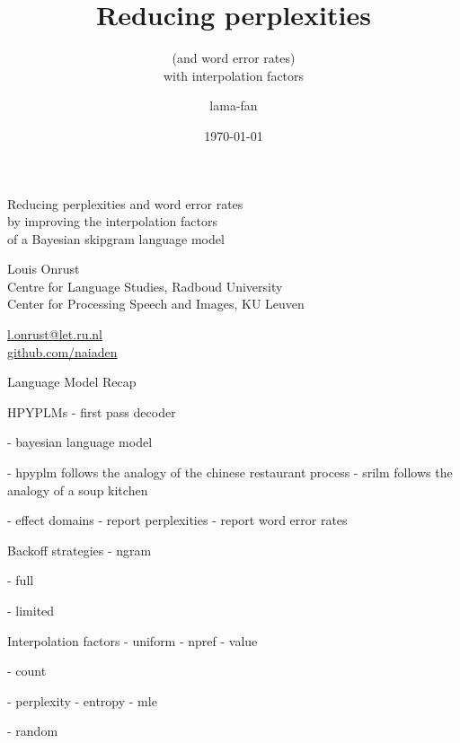 \documentclass[department=cls, grouplogo=lama, notes={hide notes}, slidesperpage=1, official=true]{beamerruhuisstijl}
\title{Reducing perplexities}
\subtitle{\hspace*{4cm}(and word error rates) \\ \hspace*{6cm} with interpolation factors}
\date{\today}
\author{lama-fan}
\begin{document}
\begin{frame}
    \titlepage
\end{frame}
\note{
}

\begin{frame}{Reducing perplexities and word error rates \\ by improving the interpolation factors \\ of a Bayesian skipgram language model}
    \begin{block}{}
        Louis Onrust \\
        Centre for Language Studies, Radboud University \\
        Center for Processing Speech and Images, KU Leuven
    \end{block}

    \begin{block}{}
        \href{mailto:l.onrust@let.ru.nl}{l.onrust@let.ru.nl} \\
        \href{https://github.com/naiaden}{github.com/naiaden}
    \end{block}
\end{frame}
\note{
}

\begin{frame}{Language Model Recap}
\end{frame}

\begin{frame}{HPYPLMs}
- first pass decoder

- bayesian language model

- hpyplm follows the analogy of the chinese restaurant process
- srilm follows the analogy of a soup kitchen

- effect domains
- report perplexities
- report word error rates
\end{frame}

\begin{frame}{Backoff strategies}
- ngram

- full

- limited
\end{frame}

\begin{frame}{Interpolation factors}
- uniform
- npref
- value

- count

- perplexity
- entropy
- mle

- random
\end{frame}
\end{document}
